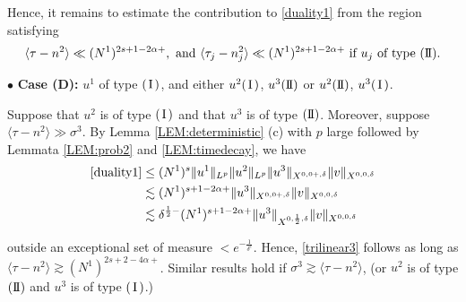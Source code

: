 \documentclass[11pt]{amsart}
\numberwithin{equation}{section} \numberwithin{theorem}{section}
\begin{document}
Hence, it remains to estimate the contribution to \eqref{duality1}
from the region satisfying
\begin{equation}
	\label{caseB} {\langle {\tau - n^2} \rangle} \ll (N^1)^{2s + 1 - 2{\alpha}+}, \text{ and } {\langle {\tau_j - n_j^2} \rangle} \ll (N^1)^{2s + 1 - 2{\alpha}+} \text{ if } u_j \text{ of type }({\text{I \hspace{-2.8mm} I} }). 
\end{equation}

\medskip

{
\noindent} $\bullet$ {\bf Case (D):} $u^1$ of type $({\hspace{0.5mm}\text{I}\hspace{0.5mm}})$, and either $u^2({\hspace{0.5mm}\text{I}\hspace{0.5mm}})$, $u^3({\text{I \hspace{-2.8mm} I} })$ or $u^2({\text{I \hspace{-2.8mm} I} })$, $u^3({\hspace{0.5mm}\text{I}\hspace{0.5mm}})$.

Suppose that $u^2$ is of type $({\hspace{0.5mm}\text{I}\hspace{0.5mm}})$ and that $u^3$ is of type $({\text{I \hspace{-2.8mm} I} })$. Moreover, suppose ${\langle {\tau - n^2} \rangle} \gg {\sigma}^3$. 
By Lemma \ref{LEM:deterministic} (c) with $p$ large followed by
 Lemmata \ref{LEM:prob2} and \ref{LEM:timedecay}, we have 
\begin{align*}
	\eqref{duality1} & \leq (N^1)^s \|u^1\|_{L^p} \|u^2\|_{L^{p}}\|u^3\|_{X^{0, 0+, {\delta}}}\|v\|_{X^{0, 0, {\delta}}}\\
	& \lesssim (N^1)^{s+1-2{\alpha}+}\|u^3\|_{X^{0, 0+, {\delta}}}\|v\|_{X^{0, 0, {\delta}}} \\
	&\lesssim {\delta}^{\frac{1}{2}-} (N^1)^{s+1-2{\alpha}+}\|u^3\|_{X^{0, \frac{1}{2}, {\delta}}}\|v\|_{X^{0, 0, {\delta}}} 
\end{align*}

{
\noindent} outside an exceptional set of measure $<e^{-\frac{1}{{\delta}^c}}$. Hence, \eqref{trilinear3} follows as long as ${\langle {\tau - n^2} \rangle} \gtrsim (N^1)^{2s + 2 - 4{\alpha}+}$. Similar results hold if ${\sigma}^3 \gtrsim {\langle {\tau-n^2} \rangle}$, (or $u^2$ is of type $({\text{I \hspace{-2.8mm} I} })$ and $u^3$ is of type $({\hspace{0.5mm}\text{I}\hspace{0.5mm}})$.) 
\end{document}
